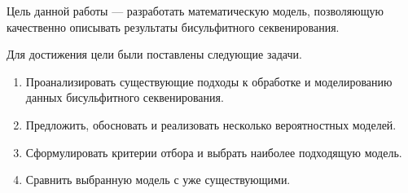 Цель данной работы --- разработать математическую модель, позволяющую качественно
описывать результаты бисульфитного секвенирования.

Для достижения цели были поставлены следующие задачи.

\begin{enumerate}
\item Проанализировать существующие подходы к обработке и моделированию данных бисульфитного
  секвенирования.
\item Предложить, обосновать и реализовать несколько вероятностных моделей.
\item Сформулировать критерии отбора и выбрать наиболее подходящую модель.
\item Сравнить выбранную модель с уже существующими.
\end{enumerate}
